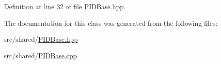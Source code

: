 Definition at line 32 of file P\-I\-D\-Base.\-hpp.



The documentation for this class was generated from the following files\-:\begin{DoxyCompactItemize}
\item 
src/shared/\hyperlink{PIDBase_8hpp}{P\-I\-D\-Base.\-hpp}\item 
src/shared/\hyperlink{PIDBase_8cpp}{P\-I\-D\-Base.\-cpp}\end{DoxyCompactItemize}
